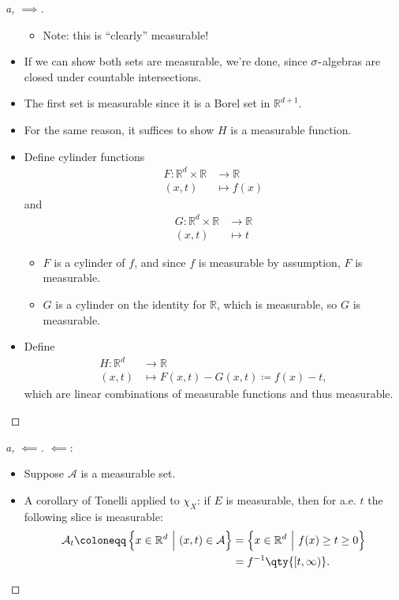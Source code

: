 \begin{solution}
\begin{proof}[a, $\implies$]
\begin{itemize}
  \begin{itemize}
  \tightlist
  \item
    Note: this is ``clearly'' measurable!
  \end{itemize}
\item
  If we can show both sets are measurable, we're done, since
  \(\sigma{\hbox{-}}\)algebras are closed under countable intersections.
\item
  The first set is measurable since it is a Borel set in
  \({\mathbb{R}}^{d+1}\).
\item
  For the same reason, it suffices to show \(H\) is a measurable
  function.
\item
  Define cylinder functions
  \begin{align*}
  F: {\mathbb{R}}^d \times{\mathbb{R}}&\to {\mathbb{R}}\\
  (x, t) &\mapsto f(x)
  \end{align*}
  and
  \begin{align*}
  G: {\mathbb{R}}^d \times{\mathbb{R}}&\to {\mathbb{R}}\\
  (x, t) &\mapsto t
  \end{align*}

  \begin{itemize}
  \tightlist
  \item
    \(F\) is a cylinder of \(f\), and since \(f\) is measurable by
    assumption, \(F\) is measurable.
  \item
    \(G\) is a cylinder on the identity for \({\mathbb{R}}\), which is
    measurable, so \(G\) is measurable.
  \end{itemize}
\item
  Define
  \begin{align*}
  H: {\mathbb{R}}^d &\to {\mathbb{R}}\\
  (x, t) &\mapsto F(x, t) - G(x, t) \coloneqq f(x) - t
  ,\end{align*}
  which are linear combinations of measurable functions and thus
  measurable.
\end{itemize}

\end{proof}

\begin{proof}[a, $\impliedby$]

\(\impliedby\):

\begin{itemize}
\item
  Suppose \({\mathcal{A}}\) is a measurable set.
\item
  A corollary of Tonelli applied to \(\chi_X\): if \(E\) is measurable,
  then for a.e. \(t\) the following slice is measurable:
  \begin{align*}
  {\mathcal{A}}_t \coloneqq\left\{{ x \in {\mathbb{R}}^d {~\mathrel{\Big|}~}(x,t) \in {\mathcal{A}}}\right\}
  &= \left\{{x\in {\mathbb{R}}^d {~\mathrel{\Big|}~}f(x) \geq t \geq 0}\right\} \\
  &= f^{-1}\qty{[t, \infty)}
  .\end{align*}


\end{itemize}
\end{proof}
\end{solution}
